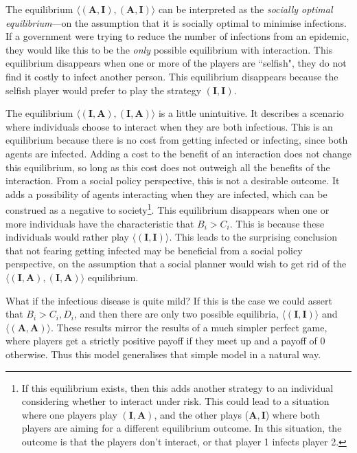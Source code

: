 \documentclass{article}
\theoremstyle{definition}
\theoremstyle{exercise}
\theoremstyle{remark}
\begin{document}
The equilibrium $\langle (\bm{A}, \bm{I}), (\bm{A}, \bm{I}) \rangle$ can be interpreted as the \emph{socially optimal equilibrium}---on the assumption that it is socially optimal to minimise infections. If a government were trying to reduce the number of infections from an epidemic, they would like this to be the \emph{only} possible equilibrium with interaction. This equilibrium disappears when one or more of the players are ``selfish", they do not find it costly to infect another person.
This equilibrium disappears because the selfish player would prefer to play the strategy $(\bm{I}, \bm{I})$.


The equilibrium $\langle (\bm{I}, \bm{A}), (\bm{I}, \bm{A}) \rangle$ is a little unintuitive. It describes a scenario where individuals choose to interact when they are both infectious. This is an equilibrium because there is no cost from getting infected or infecting, since both agents are infected. Adding a cost to the benefit of an interaction does not change this equilibrium, so long as this cost does not outweigh all the benefits of the interaction.
From a social policy perspective, this is not a desirable outcome. It adds a possibility of agents interacting when they are infected, which can be construed as a negative to society\footnote{If this equilibrium exists, then this adds another strategy to an individual considering whether to interact under risk. This could lead to a situation where one players play $(\bm{I}, \bm{A})$, and the other plays ($\bm{A}, \bm{I}$) where both players are aiming for a different equilibrium outcome. In this situation, the outcome is that the players don't interact, or that player 1 infects player 2.}. %
This equilibrium disappears when one or more individuals have the characteristic that $B_i > C_i$.  This is because these individuals would rather play $\langle (\bm{I}, \bm{I}) \rangle$. This leads to the surprising conclusion that not fearing getting infected may be beneficial from a social policy perspective, on the assumption that a social planner would wish to get rid of the $\langle (\bm{I}, \bm{A}), (\bm{I}, \bm{A}) \rangle$ equilibrium.

What if the infectious disease is quite mild? If this is the case we could assert that $B_i > C_i, D_i$, and then there are only two possible equilibria, $\langle (\bm{I}, \bm{I}) \rangle$ and $\langle (\bm{A}, \bm{A}) \rangle$. These results mirror the results of a much simpler perfect game, where players get a strictly positive payoff if they meet up and a payoff of $0$ otherwise. Thus this model generalises that simple model in a natural way.
\end{document}

